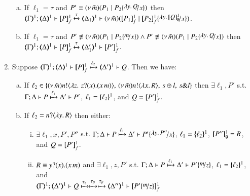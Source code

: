 \begin{proposition}
\begin{enumerate}[1.]
\begin{enumerate}[a)]
				\item
					If $\ell_1 = \tau$
					and $P' \scong \newsp{\tilde{m}}{P_1 \Par P_2 \subst{\abs{y}Q}{x}}$
					then \\
					$\horel{\tmap{\Gamma}{1}}{\tmap{\Delta}{1}}{\pmapp{P}{1}{f}}{\hby{\tau}}
					{\tmap{\Delta_1}{1}}{\newsp{\tilde{m}}{\pmapp{P_1}{1}{f}\Par \pmapp{P_2}{1}{f}\subst{\abs{y}\pmapp{Q}{1}{\emptyset}}{x}}}$.
			
				\item
					If $\ell_1 = \tau$
					and $P' \not\scong \newsp{\tilde{m}}{P_1 \Par P_2 \subst{m}{x}} \land P' \not\scong \newsp{\tilde{m}}{P_1 \Par P_2\subst{\abs{y}Q}{x}}$
					then \\
					$\horel{\tmap{\Gamma}{1}}{\tmap{\Delta}{1}}{\pmapp{P}{1}{f}}{\hby{\tau}}{\tmap{\Delta'_1}{1}}{ \pmapp{P'}{1}{f}}$.
			\end{enumerate}
			
		\item	Suppose $\horel{\tmap{\Gamma}{1}}{\tmap{\Delta}{1}}{\pmapp{P}{1}{f}}{\hby{\ell_2}}{\tmap{\Delta'}{1}}{Q}$.
			Then we have:
%
			\begin{enumerate}[a)]
				\item 
					If $\ell_2 \in
					\{(\nu\, \tilde{m})n ! \langle \lambda z.\,\,z ? (x) . (x\, {m}) \rangle, \,(\nu\, \tilde{m}) n ! \langle \lambda x.\,R \rangle, \,s \oplus l, \,s \& l\}$
					then $\exists \ell_1, P'$ s.t. \\
					$\Gamma; \Delta \vdash P \xmapsto{\ell_1} \Delta' \vdash P'$, 
					$\ell_1 = \{\!\!\{\ell_2\}\!\!\}^{1}$, 
					and
					$Q = [\!\![P']\!\!]^1_f$.
			
				\item 
					If $\ell_2 = n ? \langle \lambda y.\,R \rangle$ %
					then either:
%
					\begin{enumerate}[(i)]
						\item	$\exists \ell_1, x, P', P''$ s.t. 
							$\horel{\Gamma}{\Delta}{P}{\hby{\ell_1}}{\Delta'}{P' \subst{\abs{y}P''}{x}}$, 
							$\ell_1 = \{\!\!\{\ell_2\}\!\!\}^{1}$, $[\!\![P'']\!\!]^1_\emptyset = R$, and $Q = [\!\![P']\!\!]^1_f$.

						\item	$R \equiv y ? (x) . (x\, {m})$ and 
							$\exists \ell_1, z, P'$ s.t.
							$\horel{\Gamma}{\Delta}{P}{\hby{\ell_1}}{\Delta'}{P' \subst{m}{z}}$, 
							$\ell_1 = \{\!\!\{\ell_2\}\!\!\}^{1}$,
							and\\
							$\horel{\tmap{\Gamma}{1}}{\tmap{\Delta'}{1}}{Q}{\hby{\stau} \hby{\btau} \hby{\btau}}{\tmap{\Delta''}{1}}{\pmapp{P'\subst{m}{z}}{1}{f}}$
					\end{enumerate}
			

\end{enumerate}
\end{enumerate}
\end{proposition}
